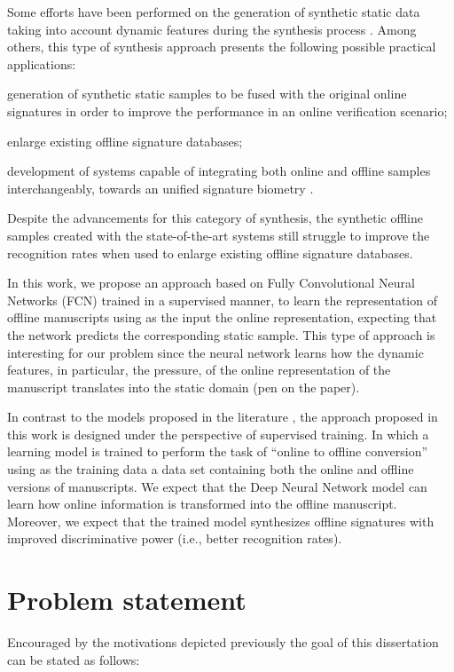 Some efforts have been performed on the generation of synthetic static data taking into account dynamic features during the synthesis process \cite{diaz2014generation}. Among others, this type of synthesis approach presents the following possible practical applications:
\begin{inlinelist}
  \item generation of synthetic static samples to be fused with the original online signatures in order to improve the performance in an online verification scenario;
  \item enlarge existing offline signature databases;
  \item development of systems capable of integrating both online and offline samples interchangeably, towards an unified signature biometry \cite{chapter}.
\end{inlinelist}

Despite the advancements for this category of synthesis, the synthetic offline samples created with the state-of-the-art systems still struggle to improve the recognition rates when used to enlarge existing offline signature databases.


In this work, we propose an approach based on Fully Convolutional Neural Networks (FCN) trained in a supervised manner, to learn the representation of offline manuscripts using as the input the online representation, expecting that the network predicts the corresponding static sample. This type of approach is interesting for our problem since the neural network learns how the dynamic features, in particular, the pressure, of the online representation of the manuscript translates into the static domain (pen on the paper). 

In contrast to the models proposed in the literature \cite{ferrer2013synthetic, ferrer2013realistic, diaz2014generation}, the approach proposed in this work is designed under the perspective of supervised training. In which a learning model is trained to perform the task of ``online to offline conversion'' using as the training data a data set containing both the online and offline versions of manuscripts. We expect that the Deep Neural Network model can learn how online information is transformed into the offline manuscript. Moreover, we expect that the trained model synthesizes offline signatures with improved discriminative power (i.e., better recognition rates). 

\section{Problem statement}
Encouraged by the motivations depicted previously the goal of this dissertation can be stated as follows:

